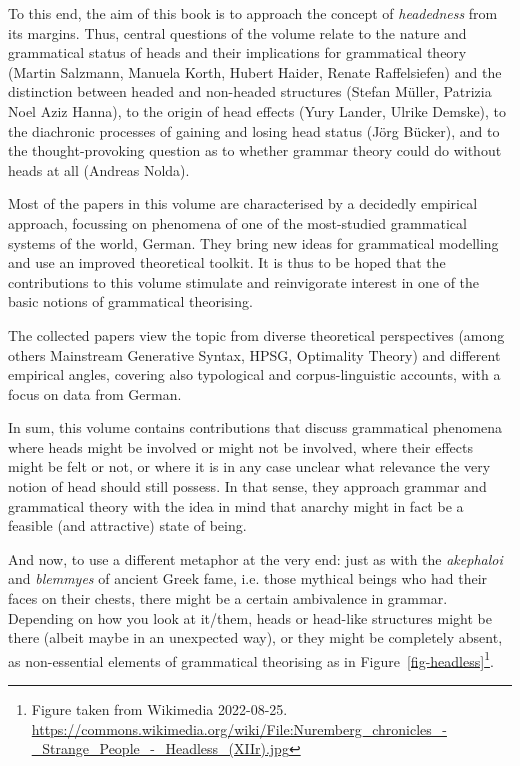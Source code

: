 \documentclass[output=paper
  ,nobabel
  ,draftmode
  ,colorlinks, citecolor=brown
]{langscibook}
\begin{document}
To this end, the aim of this book is to approach the concept of \emph{headedness} from its
margins. Thus, central questions of the volume relate to the nature and grammatical status of heads
and their implications for grammatical theory (Martin Salzmann, Manuela Korth, Hubert Haider, Renate
Raffelsiefen) and the distinction between headed and non-headed structures (Stefan Müller, Patrizia
Noel Aziz Hanna), to the origin of head effects (Yury Lander, Ulrike Demske), to the diachronic
processes of gaining and losing head status (Jörg Bücker), and to the thought-provoking question as
to whether grammar theory could do without heads at all (Andreas Nolda).

Most of the papers in this volume are characterised by a decidedly empirical approach, focussing on
phenomena of one of the most-studied grammatical systems of the world, German. They bring new ideas
for grammatical modelling and use an improved theoretical toolkit. It is thus to be hoped that the
contributions to this volume stimulate and reinvigorate interest in one of the basic notions of
grammatical theorising.

The collected papers view the topic from diverse theoretical perspectives (among others Mainstream
Generative Syntax, HPSG, Optimality Theory) and different empirical angles, covering also
typological and corpus-linguistic accounts, with a focus on data from German.

In sum, this volume contains contributions that discuss grammatical phenomena where heads might be
involved or might not be involved, where their effects might be felt or not, or where it is in any
case unclear what relevance the very notion of head should still possess. In that sense, they
approach grammar and grammatical theory with the idea in mind that anarchy might in fact be a
feasible (and attractive) state of being.

And now, to use a different metaphor at the very end: just as with the \emph{akephaloi} and
\emph{blemmyes} of ancient Greek fame, i.e. those mythical beings who had their faces on their
chests, there might be a certain ambivalence in grammar. Depending on how you look at it/them, heads
or head-like structures might be there (albeit maybe in an unexpected way), or they might be
completely absent, as non-essential elements of grammatical theorising as in Figure~\ref{fig-headless}\footnote{Figure taken from Wikimedia 2022-08-25. \url{https://commons.wikimedia.org/wiki/File:Nuremberg_chronicles_-_Strange_People_-_Headless_(XIIr).jpg}}.
\end{document}
